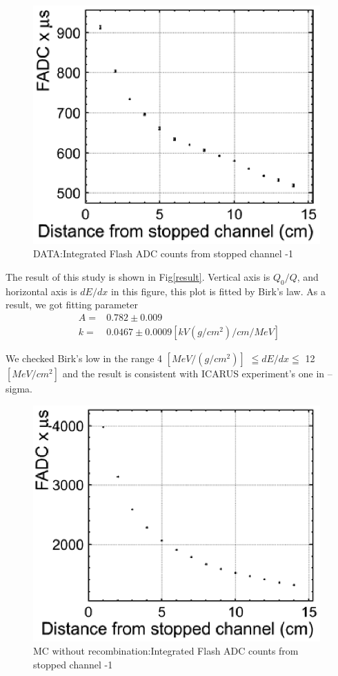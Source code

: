 \begin{figure}[!htb]
  \centering
  \centering
  \includegraphics[width=11cm,clip]{./fig/q.eps}
  \caption{DATA:Integrated Flash ADC counts from stopped channel -1}
  \label{fadcDist1}
\end{figure}
\pagebreak
\pagebreak

The result of this study is shown in Fig\ref{result}. Vertical axis is $Q_{0}/Q$, and horizontal axis is $dE/dx$ in this figure, this plot is fitted by Birk's law.
As a result, we got fitting parameter\\
\begin{eqnarray}
 \nonumber  A =& 0.782\pm0.009\\
   k =& 0.0467\pm0.0009 [kV(g/cm^{2})/cm/MeV]
\end{eqnarray}

We checked Birk's low in the range 4 $[MeV/(g/cm^2)]$ $\leqq dE/dx \leqq$ 12 $[MeV/cm^2]$ and the result is consistent with ICARUS experiment's one in -- sigma.

\begin{figure}[!htb]
  \centering
  \centering
  \includegraphics[width=11cm,clip]{./fig/q_0.eps}
  \caption{MC without recombination:Integrated Flash ADC counts from stopped channel -1}
  \label{fadcDistMC}
\end{figure}

